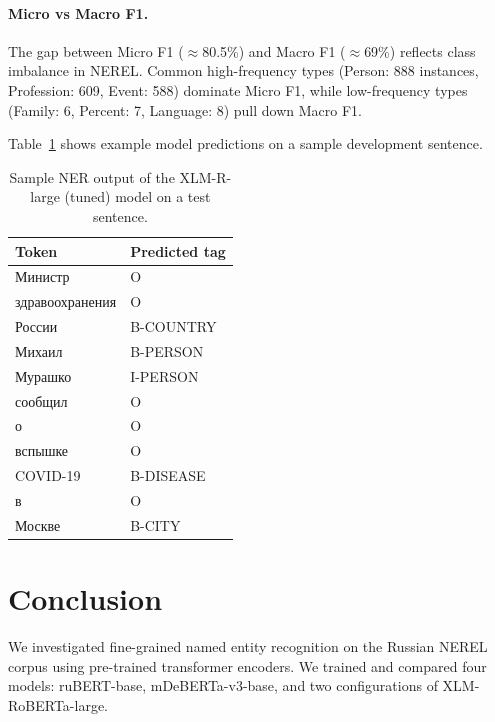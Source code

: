 \documentclass{article}
\begin{document}
\paragraph{Micro vs Macro F1.}
The gap between Micro F1 ($\approx$80.5\%) and Macro F1 ($\approx$69\%)
reflects class imbalance in NEREL.
Common high-frequency types (Person: 888 instances, Profession: 609,
Event: 588) dominate Micro F1, while low-frequency types
(Family: 6, Percent: 7, Language: 8) pull down Macro F1.

Table~\ref{tab:output} shows example model predictions on a sample development
sentence.

\begin{table}[!tbh]
  \centering
  \begin{tabular}{|l|l|}
  \hline
  \textbf{Token} & \textbf{Predicted tag} \\
  \hline
  Министр              & O \\
  здравоохранения      & O \\
  России               & B-COUNTRY \\
  Михаил               & B-PERSON \\
  Мурашко              & I-PERSON \\
  сообщил              & O \\
  о                    & O \\
  вспышке              & O \\
  COVID-19             & B-DISEASE \\
  в                    & O \\
  Москве               & B-CITY \\
  \hline
  \end{tabular}
  \caption{Sample NER output of the XLM-R-large (tuned) model on a test sentence.}
  \label{tab:output}
\end{table}

\section{Conclusion}

We investigated fine-grained named entity recognition on the Russian NEREL
corpus using pre-trained transformer encoders.
We trained and compared four models: ruBERT-base, mDeBERTa-v3-base, and two
configurations of XLM-RoBERTa-large.
\end{document}
